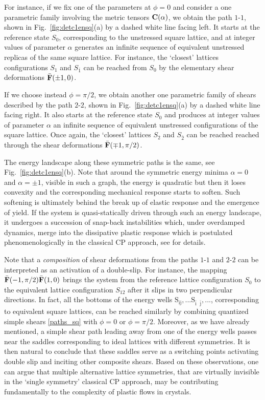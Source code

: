 \documentclass[CRPHYS,Unicode,manuscript]{cedram}
\begin{document}
For instance, if we fix one of the parameters at $\phi=0$ and consider a one parametric family  involving the  metric tensors $\bold C(\alpha)$, we obtain the path $1$-$1$,  shown  in Fig.~\ref{fig:detc1ensq}(a)  by a dashed white line facing left.  It starts at  the reference state $S_0$, corresponding to the unstressed square lattice,  and at integer values of parameter $\alpha$  generates   an infinite sequence of equivalent unstressed replicas  of the same square lattice.  For instance,  the `closest'  lattices configurations  $S_1$ and $S_{\bar1}$ can be  reached from  $S_0$ by the elementary shear deformations  $\bar{\bf F}(\pm1,0)$. 

If we choose instead $\phi =\pi/2$, we obtain another one parametric family of shears described by the  path $2$-$2$, shown in Fig.~\ref{fig:detc1ensq}(a) by a dashed white line facing right. It also starts at the reference state $S_0$ and produces  at integer values of parameter $\alpha$ an infinite sequence of equivalent unstressed configurations of the square lattice. Once again,    the `closest'  lattices   $S_2$ and $S_{\bar2}$ can be reached  reached through the shear deformations $\bar{\bf F}(\mp1,\pi/2)$. 

The   energy landscape along  these symmetric paths is the same, see   Fig.~\ref{fig:detc1ensq}(b). Note that around the symmetric energy minima $\alpha=0$ and  $\alpha=\pm 1$, visible in such a graph, the energy is quadratic but then it loses convexity and the corresponding mechanical response starts to soften. Such softening is ultimately behind the break up of elastic response and the emergence of yield. If the system is quasi-statically driven through such an energy landscape, it undergoes a succession of snap-back instabilities which, under overdamped dynamics,  merge  into  the  dissipative  plastic  response which is postulated phenomenologically in the classical CP approach, see \cite{Puglisi2005-lg} for details.

Note  that a \emph{composition} of  shear deformations from the paths  $1$-$1$ and  $2$-$2$ can be interpreted as an activation of a double-slip. For instance,  the mapping   $\bar{\bf F}(-1,\pi/2)\bar{\bf F}(1,0)$ brings the system from the reference lattice configuration   $S_0$ to  the equivalent lattice configuration   $S_{12}$ after it  slips in two perpendicular directions. In fact,  all the  bottoms of the energy wells $\mathrm{ S_{ij},... S_{\bar{i}\text{ }\bar{j} },.}..$,  corresponding to equivalent  square lattices,   can be reached similarly by combining    quantized simple shears    \eqref{paths_sq} with $\phi=0$ or $\phi=\pi/2$. Moreover, as we have already mentioned, a simple shear path leading away from one of the  energy wells passes near the saddles corresponding to ideal lattices with different symmetries. It is then natural to conclude that these saddles serve as a switching points activating double slip and inciting other composite shears.  Based on these observations, one can argue that  multiple alternative lattice symmetries, that are virtually invisible in the `single symmetry' classical CP approach,  may  be  contributing  fundamentally to the   complexity  of plastic flows in crystals. 
\end{document}
